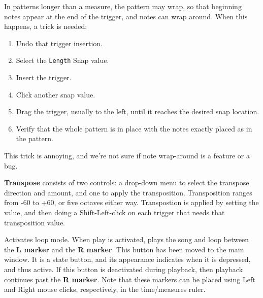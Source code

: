 
   In patterns longer than a measure,
   the pattern may wrap, so that beginning notes appear at the end of the
   trigger, and notes can wrap around.  When this happens, a trick is needed:

   \begin{enumerate}
      \item Undo that trigger insertion.
      \item Select the \texttt{Length} Snap value.
      \item Insert the trigger.
      \item Click another snap value.
      \item Drag the trigger, usually to the left, until it reaches the
         desired snap location.
      \item Verify that the whole pattern is in place with the notes exactly
         placed as in the pattern.
   \end{enumerate}

   This trick is annoying, and we're not sure if note wrap-around
   is a feature or a bug.

   \textbf{Transpose} consists of two controls:
   a drop-down menu to select the transpose direction and amount,
   and one to apply the transposition.
   Transposition ranges from -60 to +60, or five octaves either way.
   Transpostion is applied by setting the value, and then doing
   a Shift-Left-click on each trigger that needs that transposition value.

   Activates loop mode. When play is activated, plays the song and loop
   between the
   \textbf{L marker} and the \textbf{R marker}.
   This button has been moved to the main window.
   It is a state button, and its appearance indicates when it is
   depressed, and thus active.
   If this button is deactivated during playback, then playback
   continues past the \textbf{R marker}.
   Note that these markers can be placed using Left
   and Right mouse clicks, respectively, in the time/measures ruler.

